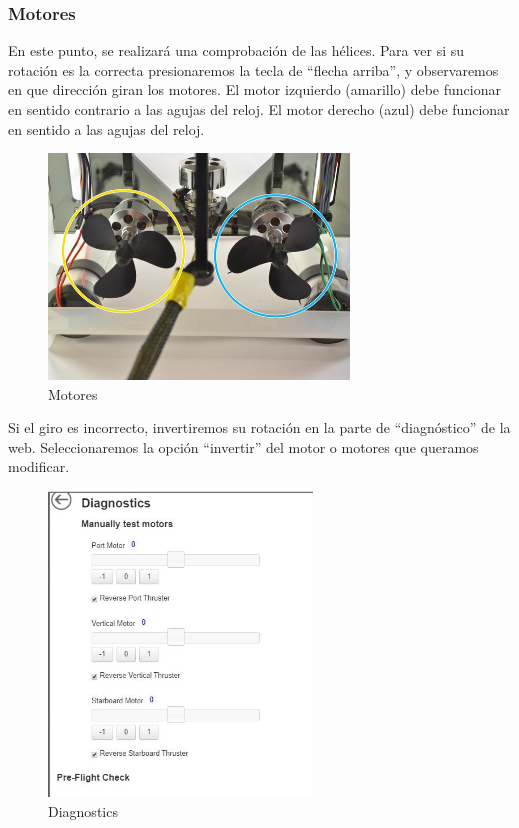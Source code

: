 \subsubsection{Motores}
\label{subsubsec:motores}
En este punto, se realizará una comprobación de las hélices. Para ver si su rotación es la correcta presionaremos la tecla de “flecha arriba”, y observaremos en que dirección giran los motores.
El motor izquierdo (amarillo) debe funcionar en sentido contrario a las agujas del reloj.
El motor derecho (azul) debe funcionar en sentido a las agujas del reloj.
\begin{figure} [hbtp]
\begin{center}
  \includegraphics[width=8cm]{img/cap3/3_4/motores}
\end{center}
\caption{Motores}
\label{fig:motores}
\end{figure}

Si el giro es incorrecto, invertiremos su rotación en la parte de “diagnóstico” de la web. Seleccionaremos la opción “invertir” del motor o motores que queramos modificar.

\begin{figure} [hbtp]
\begin{center}
  \includegraphics[width=7cm]{img/cap3/3_4/diagnostic}
\end{center}
\caption{Diagnostics}
\label{fig:diagnostics}
\end{figure} 


